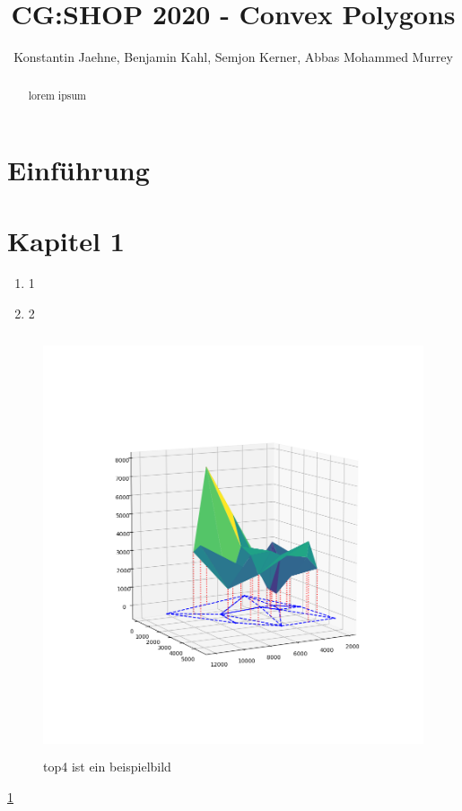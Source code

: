 \documentclass[a4paper]{article}
\title{CG:SHOP 2020 - Convex Polygons}
\author{Konstantin Jaehne, Benjamin Kahl, Semjon Kerner, Abbas Mohammed Murrey}
\begin{document}
\maketitle

\begin{abstract}
    lorem ipsum
\end{abstract}

\section{Einführung}

\section{Kapitel 1}
\begin{enumerate}
	\item 1
    \item 2
\end{enumerate}

\begin{figure}[h]
    \centering
    \includegraphics[height=350pt]{pictures/top4.png}
    \caption{\label{fig:figtitel}top4 ist ein beispielbild}
\end{figure}

\ref{fig:figtitel}
\end{document}
